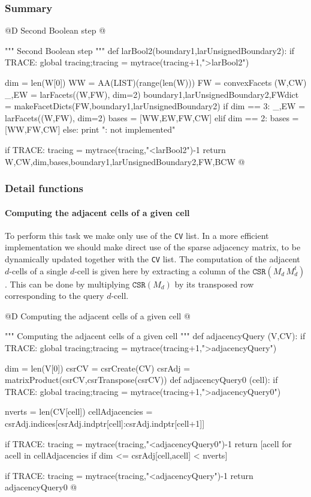 \documentclass[11pt,oneside]{article}	%
\begin{document}
\subsubsection{Summary}

@D Second Boolean step
@{""" Second Boolean step """
def larBool2(boundary1,larUnsignedBoundary2):
	if TRACE: global tracing;tracing = mytrace(tracing+1,">larBool2")

	dim = len(W[0])
	WW = AA(LIST)(range(len(W)))
	FW = convexFacets (W,CW)
	_,EW = larFacets((W,FW), dim=2)
	boundary1,larUnsignedBoundary2,FWdict = makeFacetDicts(FW,boundary1,larUnsignedBoundary2)
	if dim == 3: 
		_,EW = larFacets((W,FW), dim=2)
		bases = [WW,EW,FW,CW]
	elif dim == 2: bases = [WW,FW,CW]
	else: print "\nerror: not implemented\n"

	if TRACE: tracing = mytrace(tracing,"<larBool2")-1
	return W,CW,dim,bases,boundary1,larUnsignedBoundary2,FW,BCW
@}

\subsubsection{Detail functions}


\paragraph{Computing the adjacent cells of a given cell}
To perform this task we make only use of the \texttt{CV} list. In a more efficient implementation we should make direct use of the sparse adjacency matrix, to be dynamically updated together with the \texttt{CV} list.
The computation of the adjacent $d$-cells of a single $d$-cell is given here by extracting a column of the $\texttt{CSR}(M_d\, M_d^t)$. This can be done by multiplying $\texttt{CSR}(M_d)$ by its transposed row corresponding to the query $d$-cell. 

@D Computing the adjacent cells of a given cell
@{""" Computing the adjacent cells of a given cell """
def adjacencyQuery (V,CV):
	if TRACE: global tracing;tracing = mytrace(tracing+1,">adjacencyQuery")

	dim = len(V[0])
	csrCV =  csrCreate(CV)
	csrAdj = matrixProduct(csrCV,csrTranspose(csrCV))
	def adjacencyQuery0 (cell):
		if TRACE: global tracing;tracing = mytrace(tracing+1,">adjacencyQuery0")

		nverts = len(CV[cell])
		cellAdjacencies = csrAdj.indices[csrAdj.indptr[cell]:csrAdj.indptr[cell+1]]

		if TRACE: tracing = mytrace(tracing,"<adjacencyQuery0")-1
		return [acell for acell in cellAdjacencies if dim <= csrAdj[cell,acell] < nverts]

	if TRACE: tracing = mytrace(tracing,"<adjacencyQuery")-1
	return adjacencyQuery0
@}
\end{document}
